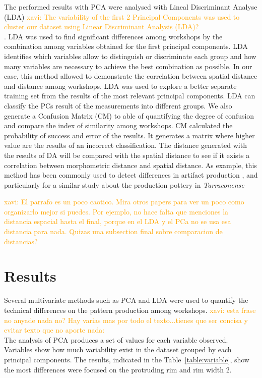 \documentclass[review]{elsarticle}
\newcommand{\memo}[2]{\textcolor{#1}{#2}}
\newcommand{\xavi}[1]{\memo{orange}{xavi: #1\\}}
\begin{document}
The performed results with PCA were analysed with Lineal Discriminant Analyse (LDA) \xavi{The variability of the first 2 Principal Components was used to cluster our dataset using Linear Discriminant Analysis (LDA)?}. LDA was used to find significant differences among workshops by the combination among variables obtained for the first principal components. LDA identifies which variables allow to distinguish or discriminate each group and how many variables are necessary to achieve the best combination as possible. In our case, this method allowed to demonstrate the correlation between spatial distance and distance among workshops. LDA was used to explore a better separate training set from the results of the most relevant principal components. LDA can classify the PCs result of the measurements into different groups.  We also generate a Confusion Matrix (CM) to able of quantifying the degree of confusion and compare the index of similarity among workshops.  CM calculated the probability of success and error of the results. It generates a matrix where higher value are the results of an incorrect classification. The distance generated with the results of DA will be compared with the spatial distance to see if it exists a correlation between morphometric distance and spatial distance. As example, this method has been commonly used to detect differences in artifact production \citep{charlton_investigating_2012, thorpe_distribution_1984}, and particularly for a similar study about the production pottery in \emph{Tarraconense} \citep{i_martin_alisis_1998}

\xavi{El parrafo es un poco caotico. Mira otros papers para ver un poco como organizarlo mejor si puedes. Por ejemplo, no hace falta que menciones la distancia espacial hasta el final, porque en el LDA y el PCa no se usa esa distancia para nada. Quizas una subsection final sobre comparacion de distancias?}


\section{Results}

Several multivariate methods such as PCA and LDA were used to quantify the technical differences on the pattern production among workshops. \xavi{esta frase no anyade nada no? Hay varias mas por todo el texto...tienes que ser concisa y evitar texto que no aporte nada: }The analysis of PCA produces a set of values for each variable observed. Variables show how much variability exist in the dataset grouped by each principal components. The results, indicated in the Table~\ref{table:variable}, show the most differences were focused on the protruding rim and rim width 2. 
\end{document}
